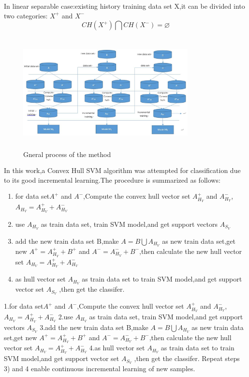 \documentclass[a4paper]{article}
\begin{document}
 In linear separable case:existing history training data set X,it can be divided into two categories: $X^{+}$ and $X^{-}$
$$
CH(X^{+}) \bigcap CH(X^{-}) = \varnothing
$$
\begin{figure}[h]
  \centering
  \includegraphics[width=9cm,height=6cm]{算法示意图}
  \caption{Gneral process of the method}
\end{figure}
In this work,a Convex Hull SVM algorithm was attempted for classification due to its good incremental learning.The procedure is summarized as follows:\\
\begin{enumerate}
\item for data set$A^{+}$ and $A^{-}$,Compute the convex hull vector set $A ^{+}_{H_{V}}$ and $A^{-}_{H_{V}}$, $A_{H_{V}} = A ^{+}_{H_{V}} + A ^{-}_{H_{V}} $
\item use $A_{H_{V}}$ as train data set, train SVM model,and get support vectors $A_{S_{V}}$ \\
\item add the new train data set B,make $A = B \bigcup A_{H_{V}}$ as new train data set,get new $A^{+} = A^{+} _{H_{V}} + B^{+}$ and $A^{-} =  A^{-} _{H_{V}} + B^{-}$,then calculate the new hull vector set  $A_{H_{V}} = A ^{+}_{H_{V}} + A ^{-}_{H_{V}} $\\
\item as hull vector set $A_{H_{V}}$ as train data set to train SVM model,and get support vector set $A_{S_{V}}$ ,then get the classifer.    
\end{enumerate}

1.for data set$A^{+}$ and $A^{-}$,Compute the convex hull vector set $A ^{+}_{H_{V}}$ and $A^{-}_{H_{V}}$, $A_{H_{V}} = A ^{+}_{H_{V}} + A ^{-}_{H_{V}} $
2.use $A_{H_{V}}$ as train data set, train SVM model,and get support vectors $A_{S_{V}}$ 
3.add the new train data set B,make $A = B \bigcup A_{H_{V}}$ as new train data set,get new $A^{+} = A^{+} _{H_{V}} + B^{+}$ and $A^{-} =  A^{-} _{H_{V}} + B^{-}$,then calculate the new hull vector set  $A_{H_{V}} = A ^{+}_{H_{V}} + A ^{-}_{H_{V}} $
4.as hull vector set $A_{H_{V}}$ as train data set to train SVM model,and get support vector set $A_{S_{V}}$ ,then get the classifer.
Repeat steps 3) and 4 enable continuous incremental learning of new samples.
\end{document}
